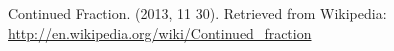 

\begin{thebibliography}{9}
	Continued Fraction. (2013, 11 30). Retrieved from Wikipedia: \url{http://en.wikipedia.org/wiki/Continued_fraction}
\end{thebibliography}